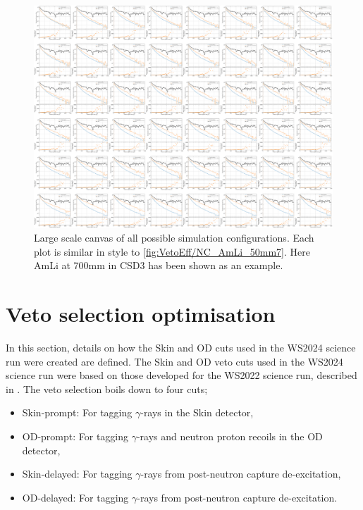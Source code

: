 \begin{figure}
	\centering
	\includegraphics[width=\linewidth]{figures/VetoEfficiency/NCTiming_Canvas_700mm_AmLi.pdf}
	\caption{Large scale canvas of all possible simulation configurations. Each plot is similar in style to \autoref{fig:VetoEff/NC_AmLi_50mm7}. Here AmLi at 700mm in CSD3 has been shown as an example.}
	\label{fig:VetoEff/NC_Canvas}
\end{figure}


\section{Veto selection optimisation}\label{sec:VetoEff/VetoSelectionOptimisation}
In this section, details on how the Skin and OD cuts used in the WS2024 science run were created are defined. The Skin and OD veto cuts used in the WS2024 science run were based on those developed for the WS2022 science run, described in \cite{LZCollaboration:2024lux}.
The veto selection boils down to four cuts;
\begin{itemize}
	\item Skin-prompt: For tagging $\gamma$-rays in the Skin detector,
	\item OD-prompt: For tagging $\gamma$-rays and neutron proton recoils in the OD detector,
	\item Skin-delayed: For tagging $\gamma$-rays from post-neutron capture de-excitation,
	\item OD-delayed: For tagging $\gamma$-rays from post-neutron capture de-excitation.
\end{itemize}

